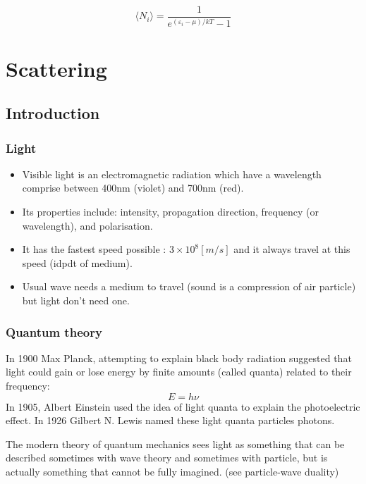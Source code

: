 \documentclass[twocolumn]{article}
\numberwithin{equation}{section}
\begin{document}
$$\langle N_i \rangle = \frac{1}{e^{(\varepsilon_i-\mu)/kT}-1}$$




\newpage
\section{Scattering}
	\subsection{Introduction}
		\subsubsection{Light}
\begin{itemize}
	\item Visible light is an electromagnetic radiation which have a wavelength comprise between 400nm (violet) and 700nm (red).
	\item Its properties include: intensity, propagation direction, frequency (or wavelength), and polarisation.
	\item It has the fastest speed possible : $3\times 10^8 [m/s]$ and it always travel at this speed (idpdt of medium).
	\item Usual wave needs a medium to travel (sound is a compression of air particle) but light don't need one.
\end{itemize}
	
		\subsubsection{Quantum theory}
In 1900 Max Planck, attempting to explain black body radiation suggested that light could gain or lose energy by finite amounts (called quanta) related to their frequency:
$$ E = h \nu$$
In 1905, Albert Einstein used the idea of light quanta to explain the photoelectric effect. In 1926 Gilbert N. Lewis named these light quanta particles photons.
 
The modern theory of quantum mechanics sees light as something that can be described sometimes with wave theory and sometimes with particle, but is actually something that cannot be fully imagined. (see particle-wave duality)
\end{document}
